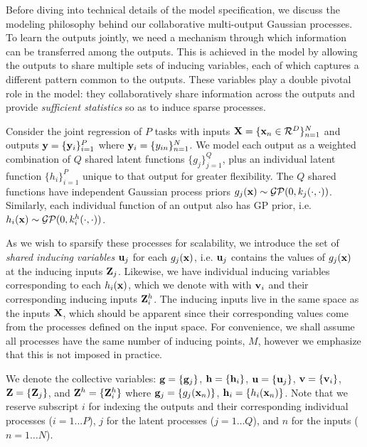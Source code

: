 Before diving into technical details of the model specification, 
we discuss the modeling philosophy behind our collaborative multi-output Gaussian processes.
To learn the outputs jointly, we need a mechanism through which information can be transferred among the outputs.
This is achieved in the model by allowing the outputs to share multiple sets of inducing variables, 
each of which captures a different pattern common to the outputs.
These variables  play a double pivotal role in the model: they collaboratively share  information 
across the outputs and  provide \emph{sufficient statistics}  so as to induce sparse processes. 

\newcommand{\Zj}{\Z_j}
\newcommand{\Zhi}{\Z^h_i}
Consider the joint regression of $P$ tasks with inputs $\mathbf{X} = \{\mathbf{x}_n \in \mathcal{R}^D\}_{n=1}^N$ and outputs $\mathbf{y} = \{\mathbf{y}_i\}_{i=1}^P$ where $\mathbf{y}_i = \{y_{in}\}_{n=1}^N$.
We  model each output as a weighted combination of $Q$ shared latent functions $\{ g_{j}\}_{j=1}^{Q}$, plus an individual latent 
function $\{ h_{i}\}_{i=1}^{P}$ unique to that output for greater flexibility.
The $Q$ shared functions have independent Gaussian process priors  $g_j(\mathbf{x}) \sim \mathcal{GP}(0, k_j(\cdot,\cdot))$. %
Similarly, each individual function of an output also has GP prior, i.e.~$h_i(\mathbf{x}) \sim \mathcal{GP}(0, k^h_i(\cdot,\cdot))$. %


As we wish to sparsify these processes for scalability, 
we introduce the set of \emph{shared inducing variables} $\mathbf{u}_j$ for  each $g_j(\mathbf{x})$, i.e. $\mathbf{u}_j$ contains the values of 
$g_j(\mathbf{x})$ at the inducing inputs $\mathbf{Z}_j$. Likewise, we have 
individual inducing variables corresponding to each  $h_i(\mathbf{x})$,  which we denote with with $\mathbf{v}_i$ and their 
corresponding inducing inputs $\Zhi$.
%
The inducing inputs live in the same space as the inputs $\mathbf{X}$, which should be apparent since their corresponding values come from the processes defined on the input space.
For convenience, we shall assume all processes have the same number of inducing points, $M$, however we emphasize that this is not
 imposed in practice.


We denote the collective variables: $\mathbf{g} = \{\mathbf{g}_j\}$, $\mathbf{h} = \{\mathbf{h}_i \}$, $\mathbf{u} = \{\mathbf{u}_j\}$, $\mathbf{v} = \{\mathbf{v}_i\}$, $\Z = \{\Zj\}$, and $\Z^h = \{\Zhi \}$ where $\mathbf{g}_j = \{g_j(\mathbf{x}_n)\}$, $\mathbf{h}_i = \{h_i(\mathbf{x}_n)\}$. 
Note that we reserve subscript $i$ for indexing the outputs and their corresponding individual processes ($i = 1 \hdots P$), $j$ for the latent processes ($j = 1 \hdots Q$), and $n$ for the inputs ($n = 1 \hdots N$).
%
